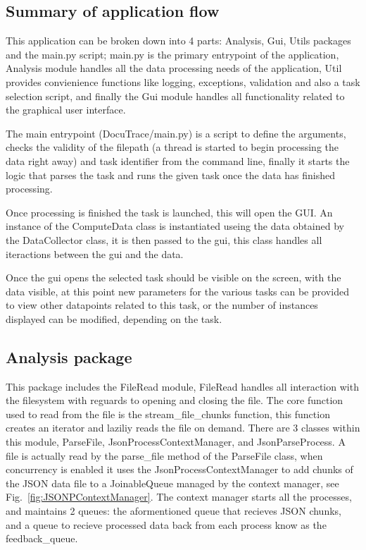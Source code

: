 \documentclass[11pt]{article}
\begin{document}
\subsection{Summary of application flow}
This application can be broken down into 4 parts: Analysis, Gui, Utils packages and the main.py script; 
main.py is the primary entrypoint of the application, Analysis module handles all the data processing needs of the application, Util provides convienience functions like logging, exceptions, validation and also a task selection script, and finally the Gui module handles all functionality related to the graphical user interface. 

The main entrypoint (DocuTrace/main.py) is a script to define the arguments, checks the validity of the filepath (a thread is started to begin processing the data right away) and task identifier from the command line, finally it starts the logic that parses the task and runs the given task once the data has finished processing.

Once processing is finished the task is launched, this will open the GUI. 
An instance of the ComputeData class is instantiated useing the data obtained by the DataCollector class, it is then passed to the gui, this class handles all iteractions between the gui and the data.

Once the gui opens the selected task should be visible on the screen, with the data visible, at this point new parameters for the various tasks can be provided to view other datapoints related to this task, or the number of instances displayed can be modified, depending on the task.

\subsection{Analysis package}

This package includes the FileRead module, FileRead handles all interaction with the filesystem with reguards to opening and closing the file. The core function used to read from the file is the stream\_file\_chunks function, this function creates an iterator and laziliy reads the file on demand. 
There are 3 classes within this module, ParseFile, JsonProcessContextManager, and JsonParseProcess. 
A file is actually read by the parse\_file method of the ParseFile class, when concurrency is enabled it uses the JsonProcessContextManager to add chunks of the JSON data file to a JoinableQueue managed by the context manager, see Fig.~\ref{fig:JSONPContextManager}.
The context manager starts all the processes, and maintains 2 queues: the aformentioned queue that recieves JSON chunks, and a queue to recieve processed data back from each process know as the feedback\_queue.
\end{document}
